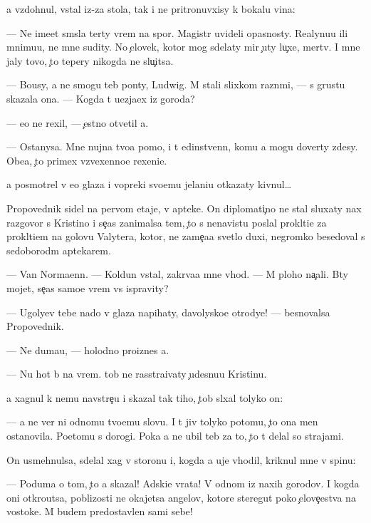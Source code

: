 \documentclass[10pt]{book}
\begin{document}
{\Y}a vzdohnul, vstal iz-za stola, tak i ne pritronuvxisy k bokalu vina:

— Ne ime{\y}et sm{\yi}sla ter{\ia}ty vrem{\ia} na spor{\yi}. Magistr{\yi} uvideli opasnosty. Realynu{\y}u ili mnimu{\y}u, ne mne sudity. No {\c}elovek, kotor{\yi}{\y} mog sdelaty mir {\c}uty lu{\c}xe, mertv. I mne jaly tovo, {\c}to tepery nikogda ne slu{\c}itsa.

— Bo{\y}usy, {\y}a ne smogu teb{\ia} pon{\ia}ty, Ludwig. M{\yi} stali slixkom razn{\yi}mi, — s grust{\y}u skazala ona. — Kogda t{\yi} u{\y}ezja{\y}ex iz goroda?

— {\y}e{\x}o ne rexil, — {\c}estno otvetil {\y}a.

— Ostanysa. Mne nujna tvo{\y}a pomo{\x}, i t{\yi} {\y}edinstvenn{\yi}{\y}, komu {\y}a mogu dover{\ia}ty zdesy. Obe{\x}a{\y}, {\c}to primex vzvexenno{\y}e rexeni{\y}e.

{\Y}a posmotrel v {\y}e{\y}o glaza i vopreki svo{\y}emu jelani{\y}u otkazaty kivnul…

Propovednik sidel na pervom etaje, v apteke. On diplomati{\c}no ne stal sluxaty nax razgovor s Kristino{\y} i se{\y}{\c}as zanimalsa tem, {\c}to s nenavist{\y}u pos{\yi}lal prokl{\ia}ti{\y}e za prokl{\ia}ti{\y}em na golovu Valytera, kotor{\yi}{\y}, ne zame{\c}a{\y}a svetlo{\y} duxi, negromko besedoval s sedoborod{\yi}m aptekarem.

— Van Norma{\y}enn. — Koldun vstal, zakr{\yi}va{\y}a mne v{\yi}hod. — M{\yi} ploho na{\c}ali. B{\yi}ty mojet, se{\y}{\c}as samo{\y}e vrem{\ia} vs{\e} ispravity?

— Ugolyev tebe nado v glaza napihaty, d{\y}avolysko{\y}e otrodye! — besnovalsa Propovednik.

— Ne duma{\y}u, — holodno pro{\y}iznes {\y}a.

— Nu hot{\ia} b{\yi} na vrem{\ia}. {\C}tob{\yi} ne rasstra{\y}ivaty {\c}udesnu{\y}u Kristinu.

{\Y}a xagnul k nemu navstre{\c}u i skazal tak tiho, {\c}tob{\yi} sl{\yi}xal tolyko on:

— {\Y}a ne ver{\iu} ni odnomu tvo{\y}emu slovu. I t{\yi} jiv tolyko potomu, {\c}to ona men{\ia} ostanovila. Poetomu s dorogi. Poka {\y}a ne ubil teb{\ia} za to, {\c}to t{\yi} delal so strajami.

On usmehnulsa, sdelal xag v storonu i, kogda {\y}a uje v{\yi}hodil, kriknul mne v spinu:

— Poduma{\y} o tom, {\c}to {\y}a skazal! Adski{\y}e vrata! V odnom iz naxih gorodov. I kogda oni otkro{\y}utsa, poblizosti ne okajetsa angelov, kotor{\yi}{\y}e steregut poko{\y} {\c}elove{\c}estva na vostoke. M{\yi} budem predostavlen{\yi} sami sebe!
\end{document}
